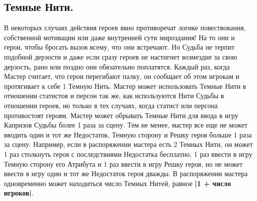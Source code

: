 \subsection{Темные Нити.} В некоторых случаях действия героев явно противоречат логике повествования, собственной мотивации или даже внутренней сути мироздания! На то они и герои, чтобы бросать вызов всему, что они встречают. Но Судьба не терпит подобной дерзости и даже если сразу героев не настигнет возмездие за свою дерзость, рано или поздно они обязательно поплатятся.
\newline Каждый раз, когда Мастер считает, что герои перегибают палку, он сообщает об этом игрокам и протягивает к себе 1 Темную Нить.
\newline Мастер может использовать Темные Нити в отношении статистов и персон так же, как используются Нити Судьбы в отношении героев, но только в тех случаях, когда статист или персона противостоят героям.
\newline Мастер может обрывать Темные Нити для ввода в игру Капризов Судьбы более 1 раза за сцену. Тем не менее, мастер все еще не может вводить один и тот же Недостаток, Темную сторону и Решку героя больше 1 раза за сцену. Например, если в распоряжении мастера есть 2 Темных Нити, он может 1 раз столкнуть героя с последствиями Недостатка бесплатно, 1 раз ввести в игру Темную сторону его Атрибута и 1 раз ввести в игру Решку героя, но не может ввести в игру один и тот же Недостаток героя дважды. В распоряжении мастера одновременно может находиться число Темных Нитей, равное \textbf{|1 + число игроков|}.